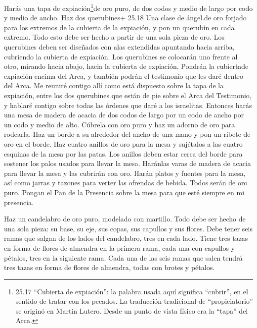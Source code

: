  Harás una tapa de expiación\footnote{25.17 ``Cubierta de
  expiación'': la palabra usada aquí significa ``cubrir'', en el sentido
  de tratar con los pecados. La traducción tradicional de
  ``propiciatorio'' se originó en Martín Lutero. Desde un punto de vista
  físico era la ``tapa'' del Arca.}de oro puro, de dos codos y medio de
largo por codo y medio de ancho.  Haz dos querubines+ 25.18
Una clase de ángel.de oro forjado para los extremos de la cubierta de la
expiación,  y pon un querubín en cada extremo. Todo esto
debe ser hecho a partir de una sola pieza de oro.  Los
querubines deben ser diseñados con alas extendidas apuntando hacia
arriba, cubriendo la cubierta de expiación. Los querubines se colocarán
uno frente al otro, mirando hacia abajo, hacia la cubierta de expiación.
 Pondrán la cubiertade expiación encima del Arca, y también
podrán el testimonio que les daré dentro del Arca.  Me
reuniré contigo allí como está dispuesto sobre la tapa de la expiación,
entre los dos querubines que están de pie sobre el Arca del Testimonio,
y hablaré contigo sobre todas las órdenes que daré a los israelitas.
 Entonces harás una mesa de madera de acacia de dos codos
de largo por un codo de ancho por un codo y medio de alto. 
Cúbrela con oro puro y haz un adorno de oro para rodearla. 
Haz un borde a su alrededor del ancho de una mano y pon un ribete de oro
en el borde.  Haz cuatro anillos de oro para la mesa y
sujétalos a las cuatro esquinas de la mesa por las patas. 
Los anillos deben estar cerca del borde para sostener los palos usados
para llevar la mesa.  Haránlas varas de madera de acacia
para llevar la mesa y las cubrirán con oro.  Harán platos y
fuentes para la mesa, así como jarras y tazones para verter las ofrendas
de bebida. Todos serán de oro puro.  Pongan el Pan de la
Presencia sobre la mesa para que esté siempre en mi presencia.

 Haz un candelabro de oro puro, modelado con martillo. Todo
debe ser hecho de una sola pieza: su base, su eje, sus copas, sus
capullos y sus flores.  Debe tener seis ramas que salgan de
los lados del candelabro, tres en cada lado.  Tiene tres
tazas en forma de flores de almendra en la primera rama, cada una con
capullos y pétalos, tres en la siguiente rama. Cada una de las seis
ramas que salen tendrá tres tazas en forma de flores de almendra, todas
con brotes y pétalos.

